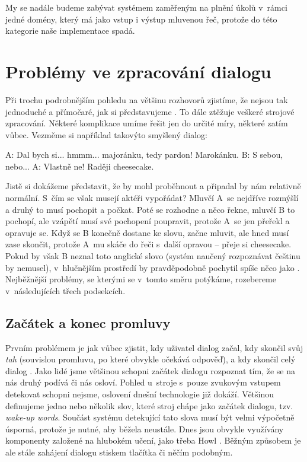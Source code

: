 My se nadále budeme zabývat systémem zaměřeným na plnění úkolů v~rámci jedné
domény, který má jako vstup i výstup mluvenou řeč, protože do této kategorie
naše implementace spadá.

\section{Problémy ve zpracování dialogu}

Při trochu podrobnějším pohledu na většinu rozhovorů zjistíme, že nejsou
tak jednoduché a přímočaré, jak si představujeme \citep[sekce 24.1]{jurafsky_slp_2020}. To dále ztěžuje
veškeré strojové zpracování. Některé komplikace umíme řešit jen do určité
míry, některé zatím vůbec. Vezměme si například takovýto smyšlený dialog:

\begin{code}
    A: Dal bych si... hmmm... majoránku, tedy pardon! Marokánku.
    B: S sebou, nebo...
    A: Vlastně ne! Raději cheesecake.
\end{code}

Jistě si dokážeme představit, že by mohl proběhnout a připadal by nám
relativně normální. S~čím se však musejí aktéři vypořádat? Mluvčí A~se
nejdříve rozmýšlí a druhý to musí pochopit a počkat. Poté se rozhodne
a něco řekne, mluvčí B to pochopí, ale vzápětí musí své pochopení
poupravit, protože A~se jen přeřekl a opravuje se. Když se B konečně
dostane ke slovu, začne mluvit, ale hned musí zase skončit, protože
A~mu skáče do řeči s~další opravou -- přeje si cheesecake. Pokud by
však B neznal toto anglické slovo (systém naučený rozpoznávat češtinu
by nemusel), v~hlučnějším prostředí by pravděpodobně pochytil spíše
něco jako . Nejběžnější problémy, se kterými se v~tomto
směru potýkáme, rozebereme v~následujících třech podsekcích.

\subsection{Začátek a konec promluvy}

Prvním problémem je jak vůbec zjistit, kdy uživatel dialog začal, kdy
skončil svůj \textit{tah} (souvislou promluvu, po které obvykle očekává odpověď),
a kdy skončil celý dialog \citep[strana 494]{jurafsky_slp_2020}.
Jako lidé jsme většinou schopni začátek dialogu rozpoznat tím, že se na
nás druhý podívá či nás osloví. Pohled u~stroje s~pouze zvukovým vstupem
detekovat schopni nejsme, oslovení dnešní technologie již dokáží. Většinou
definujeme jedno nebo několik slov, které stroj chápe jako začátek dialogu,
tzv. \textit{wake-up words}. Součást systému detekující tato slova musí být velmi
výpočetně úsporná, protože je nutné, aby běžela neustále. Dnes jsou obvykle
využívány komponenty založené na hlubokém učení, jako třeba Howl
\citep{tang_howl_2020}.
Běžným způsobem je ale stále zahájení dialogu stiskem tlačítka či něčím
podobným.

